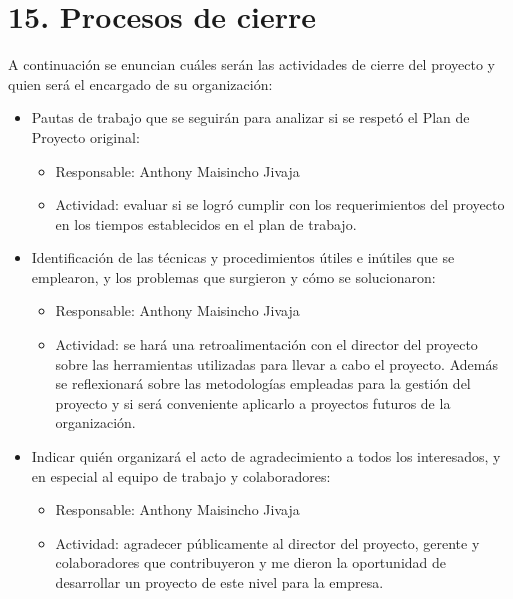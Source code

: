 \documentclass[
11pt, %
]{charter}
\begin{document}
	
\section{15. Procesos de cierre}    
\label{sec:cierre}


A continuación se enuncian cuáles serán las actividades de cierre del proyecto y quien será el
encargado de su organización:
\begin{itemize}
	\item Pautas de trabajo que se seguirán para analizar si se respetó el Plan de Proyecto original:
	\begin{itemize}
		\item Responsable: Anthony Maisincho Jivaja
		\item Actividad: evaluar si se logró cumplir con los requerimientos del proyecto en los tiempos establecidos en el plan de trabajo.
	\end{itemize}

	\item Identificación de las técnicas y procedimientos útiles e inútiles que se emplearon, y los problemas que surgieron y cómo se solucionaron:
	\begin{itemize}
		\item Responsable: Anthony Maisincho Jivaja
		\item Actividad: se hará una retroalimentación con el director del proyecto sobre las herramientas utilizadas para llevar a cabo el proyecto. Además se reflexionará sobre las metodologías empleadas para la gestión del proyecto y si será conveniente aplicarlo a proyectos futuros de la organización.
	\end{itemize}
	\item Indicar quién organizará el acto de agradecimiento a todos los interesados, y en especial al equipo de trabajo y colaboradores:
	\begin{itemize}
		\item Responsable: Anthony Maisincho Jivaja
		\item Actividad: agradecer públicamente al director del proyecto, gerente y colaboradores que contribuyeron y me dieron la oportunidad de desarrollar un proyecto de este nivel para la empresa.
	\end{itemize}
\end{itemize}
\end{document}
